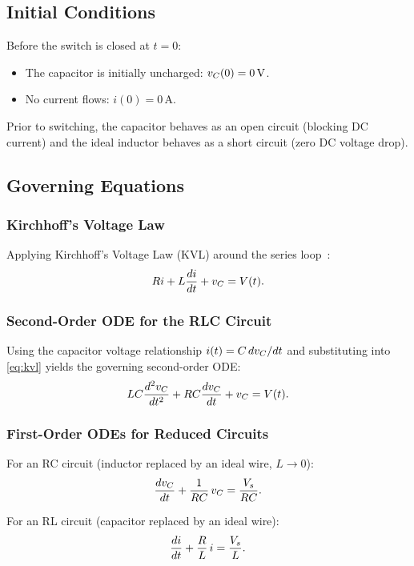 \subsection{Initial Conditions}

Before the switch is closed at $t = 0$:
\begin{itemize}
  \item The capacitor is initially uncharged: $v_C(0) = 0\,\mathrm{V}$.
  \item No current flows: $i(0) = 0\,\mathrm{A}$.
\end{itemize}
Prior to switching, the capacitor behaves as an open circuit (blocking DC
current) and the ideal inductor behaves as a short circuit (zero DC voltage
drop).

\subsection{Governing Equations}

\subsubsection{Kirchhoff's Voltage Law}

Applying Kirchhoff's Voltage Law (KVL) around the series loop~\cite{nilsson2019}:
\begin{equation}
  Ri + L\frac{di}{dt} + v_C = V(t).
  \label{eq:kvl}
\end{equation}

\subsubsection{Second-Order ODE for the RLC Circuit}

Using the capacitor voltage relationship $i(t) = C\,dv_C/dt$ and
substituting into \eqref{eq:kvl} yields the governing second-order ODE:
\begin{equation}
  LC\frac{d^2v_C}{dt^2} + RC\frac{dv_C}{dt} + v_C = V(t).
  \label{eq:rlc2nd}
\end{equation}

\subsubsection{First-Order ODEs for Reduced Circuits}

For an RC circuit (inductor replaced by an ideal wire, $L \to 0$):
\begin{equation}
  \frac{dv_C}{dt} + \frac{1}{RC}\,v_C = \frac{V_s}{RC}.
  \label{eq:rc1st}
\end{equation}

For an RL circuit (capacitor replaced by an ideal wire):
\begin{equation}
  \frac{di}{dt} + \frac{R}{L}\,i = \frac{V_s}{L}.
  \label{eq:rl1st}
\end{equation}
